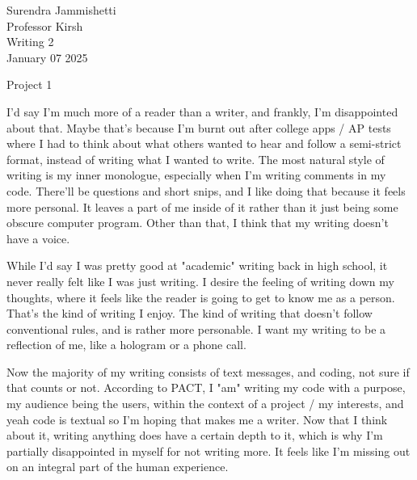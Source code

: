 \documentclass[12pt]{article}
\begin{document}
\begin{flushleft}

	Surendra Jammishetti\\
	Professor Kirsh\\
	Writing 2\\
	January 07 2025\\


	\begin{center}
		Project 1
	\end{center}


	\setlength{\parindent}{0.5in}

	I'd say I'm much more of a reader than a writer, and frankly, I'm disappointed about that.
	Maybe that's because I'm burnt out after college apps / AP tests where I had to think
	about what others wanted to hear and follow a semi-strict format, instead of writing what
	I wanted to write. The most natural style of writing is my inner monologue, especially when
	I'm writing comments in my code. There'll be questions and short snips, and I like
	doing that because it feels more personal. It leaves a part of me inside of it
	rather than it just being some obscure computer program. Other than that, I think that
	my writing doesn't have a voice.

	While I'd say I was pretty good at "academic" writing back in high school,
	it never really felt like I was just writing. I desire the feeling of writing
	down my thoughts, where it feels like the reader is going to get to know me as
	a person. That's the kind of writing I enjoy. The kind of writing that doesn't follow
	conventional rules, and is rather more personable. I want my writing to be a reflection
	of me, like a hologram or a phone call.

	Now the majority of my writing consists of text messages, and coding, not sure if that
	counts or not. According to PACT, I "am" writing my code with a purpose, my audience being
	the users, within the context of a project / my interests, and yeah code is textual so I'm hoping that
	makes me a writer. Now that I think about it, writing anything does have a certain
	depth to it, which is why I'm partially disappointed in myself for not writing more. It
	feels like I'm missing out on an integral part of the human experience.


\end{flushleft}
\end{document}
